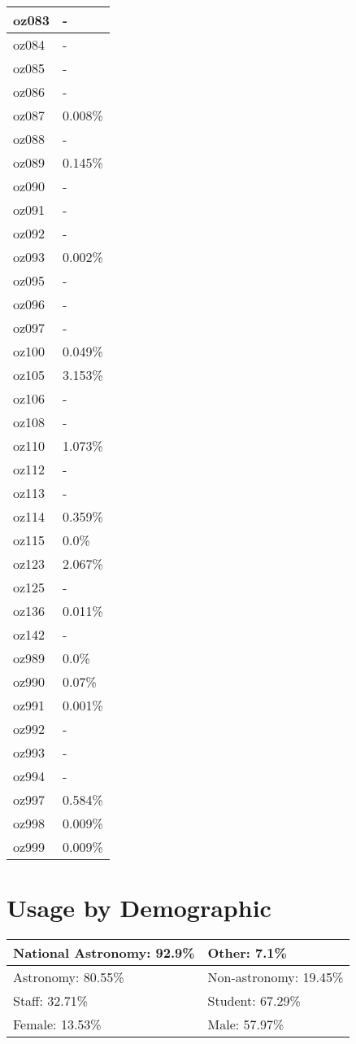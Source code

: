 \documentclass{article}%
\begin{document}
\begin{longtabu}{X[l] X[r]}
oz083&{-}\\%
\hline%
oz084&{-}\\%
\hline%
oz085&{-}\\%
\hline%
oz086&{-}\\%
\hline%
oz087&0.008\%\\%
\hline%
oz088&{-}\\%
\hline%
oz089&0.145\%\\%
\hline%
oz090&{-}\\%
\hline%
oz091&{-}\\%
\hline%
oz092&{-}\\%
\hline%
oz093&0.002\%\\%
\hline%
oz095&{-}\\%
\hline%
oz096&{-}\\%
\hline%
oz097&{-}\\%
\hline%
oz100&0.049\%\\%
\hline%
oz105&3.153\%\\%
\hline%
oz106&{-}\\%
\hline%
oz108&{-}\\%
\hline%
oz110&1.073\%\\%
\hline%
oz112&{-}\\%
\hline%
oz113&{-}\\%
\hline%
oz114&0.359\%\\%
\hline%
oz115&0.0\%\\%
\hline%
oz123&2.067\%\\%
\hline%
oz125&{-}\\%
\hline%
oz136&0.011\%\\%
\hline%
oz142&{-}\\%
\hline%
oz989&0.0\%\\%
\hline%
oz990&0.07\%\\%
\hline%
oz991&0.001\%\\%
\hline%
oz992&{-}\\%
\hline%
oz993&{-}\\%
\hline%
oz994&{-}\\%
\hline%
oz997&0.584\%\\%
\hline%
oz998&0.009\%\\%
\hline%
oz999&0.009\%\\%
\hline%
\end{longtabu}%
\section{Usage by Demographic}%

%
\begin{longtabu}{X[l] X[l]}%
National Astronomy:  92.9\%&Other:  7.1\%\\%
\hline%
Astronomy:  80.55\%&Non{-}astronomy:  19.45\%\\%
\hline%
Staff:  32.71\%&Student:  67.29\%\\%
\hline%
Female:  13.53\%&Male:  57.97\%\\%
\hline%
\end{longtabu}%
\newpage%
\end{document}
